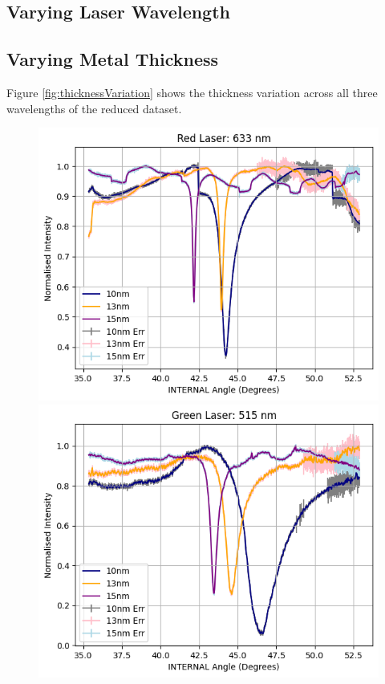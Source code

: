 \documentclass[%
reprint,
amsmath,amssymb,
aps,
]{revtex4-2}
\begin{document}
		\subsection{Varying Laser Wavelength}
		
		\subsection{Varying Metal Thickness}
			
			Figure \ref{fig:thicknessVariation} shows the thickness variation across all three wavelengths of the reduced dataset.
			
			\begin{figure}
				\includegraphics[width=0.85\columnwidth]{redThicknessVariation.png}
				\includegraphics[width=0.85\columnwidth]{greenThicknessVariation.png}

\end{figure}
\end{document}
